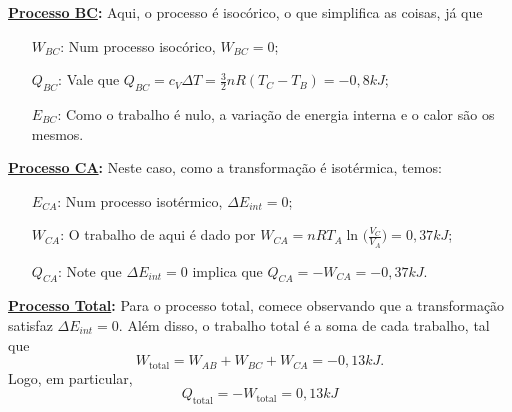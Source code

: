 \documentclass[PhysicsII/phsyicsII_notes.tex]{subfiles}
\begin{document}
\begin{example}
	\textbf{\underline{Processo BC}:} Aqui, o processo é isocórico, o que simplifica as coisas, já que
	\begin{itemize}
		\item[\(W_{BC}\):] Num processo isocórico, \(W_{BC} = 0\);
		\item[\(Q_{BC}\):] Vale que \(Q_{BC} = c_{V}\Delta T = \frac{3}{2}nR(T_{C} - T_{B}) = - 0,8kJ\);
		\item[\(E_{BC}\):] Como o trabalho é nulo, a variação de energia interna e o calor são os mesmos.
	\end{itemize}

	\textbf{\underline{Processo CA}:} Neste caso, como a transformação é isotérmica, temos:
	\begin{itemize}
		\item[\(E_{CA}\):] Num processo isotérmico, \(\Delta E_{int} = 0\);
		\item[\(W_{CA}\):] O trabalho de aqui é dado por \(W_{CA} = nRT_{A}\ln^{}{\biggl(\frac{V_{C}}{V_{A}}\biggr)} = 0,37kJ\);
		\item[\(Q_{CA}\):] Note que \(\Delta E_{int} = 0\) implica que \(Q_{CA} = - W_{CA} = -0,37kJ\).
	\end{itemize}

	\textbf{\underline{Processo Total}:} Para o processo total, comece observando que a transformação
	satisfaz \(\Delta E_{int} = 0\). Além disso, o trabalho total é a soma de cada trabalho, tal que
	\[
		W_{\text{total}} = W_{AB} + W_{BC} + W_{CA} = -0,13kJ.
	\]
	Logo, em particular,
	\[
		Q_{\text{total}} = - W_{\text{total}} = 0,13kJ
	\]
\end{example}
\end{document}
